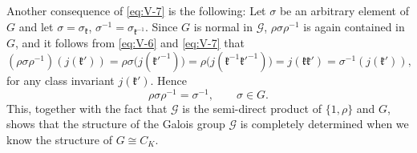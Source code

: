 Another consequence of \eqref{eq:V-7} is the following: Let $\sigma$ be
an arbitrary element of $G$ and let $\sigma=\sigma_{\mathfrak{k}}$,
$\sigma^{-1}=\sigma_{\mathfrak{k}^{-1}}$. Since $G$ is normal in
$\mathcal{G}$, $\rho\sigma\rho^{-1}$ is again contained in $G$, and it
follows from \eqref{eq:V-6} and \eqref{eq:V-7} that
\[
(\rho\sigma\rho^{-1})(j(\mathfrak{k}'))
=\rho\sigma\bigl(j(\mathfrak{k}'^{-1})\bigr)
=\rho\bigl(j(\mathfrak{k}^{-1}\mathfrak{k}'^{-1})\bigr)
=j(\mathfrak{k}\mathfrak{k}')
=\sigma^{-1}(j(\mathfrak{k}')),
\]
for any class invariant $j(\mathfrak{k}')$. Hence
\[
\rho\sigma\rho^{-1}=\sigma^{-1},\qquad\sigma\in G.
\]
This, together with the fact that $\mathcal{G}$ is the semi-direct product
of $\{1,\rho\}$ and $G$, shows that the structure of the Galois group
$\mathcal{G}$ is completely determined when we know the structure of
$G\cong C_{K}$.
